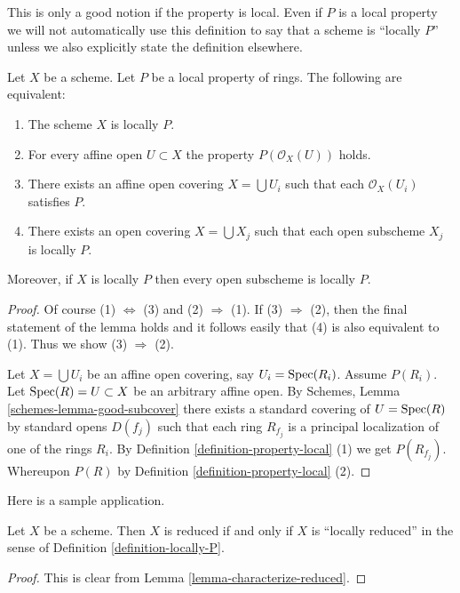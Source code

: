 \noindent
This is only a good notion if the property is local.
Even if $P$ is a local property we will not
automatically use this definition to say that a scheme is
``locally $P$'' unless we also explicitly state the definition
elsewhere.

\begin{lemma}
\label{lemma-locally-P}
Let $X$ be a scheme. Let $P$ be a local property of rings.
The following are equivalent:
\begin{enumerate}
\item The scheme $X$ is locally $P$.
\item For every affine open $U \subset X$ the property
$P(\mathcal{O}_X(U))$ holds.
\item There exists an affine open covering $X = \bigcup U_i$ such that
each $\mathcal{O}_X(U_i)$ satisfies $P$.
\item There exists an open covering $X = \bigcup X_j$
such that each open subscheme $X_j$ is locally $P$.
\end{enumerate}
Moreover, if $X$ is locally $P$ then every open subscheme
is locally $P$.
\end{lemma}

\begin{proof}
Of course (1) $\Leftrightarrow$ (3) and (2) $\Rightarrow$ (1).
If (3) $\Rightarrow$ (2), then the final statement of the lemma
holds and it follows easily that (4) is also equivalent to (1).
Thus we show (3) $\Rightarrow$ (2).

\medskip\noindent
Let $X = \bigcup U_i$ be an affine open covering, say
$U_i = \mathop{\mathrm{Spec}}(R_i)$. Assume $P(R_i)$.
Let $\mathop{\mathrm{Spec}}(R) = U \subset X$ be an arbitrary affine open.
By Schemes, Lemma \ref{schemes-lemma-good-subcover}
there exists a standard covering of $U = \mathop{\mathrm{Spec}}(R)$ by
standard opens $D(f_j)$ such that each ring $R_{f_j}$ is a
principal localization of one of the rings $R_i$. By
Definition \ref{definition-property-local} (1) we get $P(R_{f_j})$.
Whereupon $P(R)$ by Definition \ref{definition-property-local} (2).
\end{proof}

\noindent
Here is a sample application.

\begin{lemma}
\label{lemma-reduced-is-locally-reduced}
Let $X$ be a scheme. Then $X$ is reduced if and only if $X$ is
``locally reduced'' in the sense of Definition \ref{definition-locally-P}.
\end{lemma}

\begin{proof}
This is clear from Lemma \ref{lemma-characterize-reduced}.
\end{proof}

